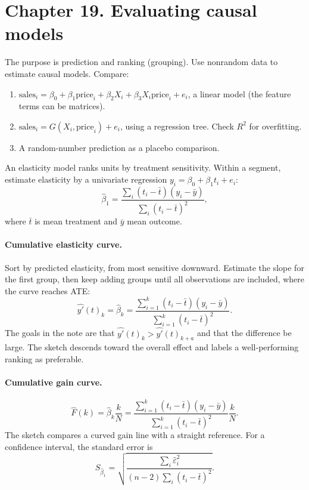 {\section{Chapter 19. Evaluating causal models}
The purpose is prediction and ranking (grouping). Use nonrandom data to estimate causal models. Compare:
\begin{enumerate}
\item $\mathrm{sales}_i=\beta_0+\beta_1\mathrm{price}_i+\beta_2X_i+\beta_3X_i\mathrm{price}_i+e_i$, a linear model (the feature terms can be matrices).
\item $\mathrm{sales}_i=G(X_i,\mathrm{price}_i)+e_i$, using a regression tree. Check $R^2$ for overfitting.
\item A random-number prediction as a placebo comparison.
\end{enumerate}
An elasticity model ranks units by treatment sensitivity. Within a segment, estimate elasticity by a univariate regression $y_i=\beta_0+\beta_1t_i+e_i$:
\[\hat\beta_1=\frac{\sum_i(t_i-\bar t)(y_i-\bar y)}{\sum_i(t_i-\bar t)^2},\]
where $\bar t$ is mean treatment and $\bar y$ mean outcome.

\paragraph{Cumulative elasticity curve.}
Sort by predicted elasticity, from most sensitive downward. Estimate the slope for the first group, then keep adding groups until all observations are included, where the curve reaches ATE:
\[\widehat{y'}(t)_k=\hat\beta_k=
\frac{\sum_{i=1}^{k}(t_i-\bar t)(y_i-\bar y)}{\sum_{i=1}^{k}(t_i-\bar t)^2}.\]
The goals in the note are that $\widehat{y'}(t)_k>\widehat{y'}(t)_{k+a}$ and that the difference be large. The sketch descends toward the overall effect and labels a well-performing ranking as preferable.

\paragraph{Cumulative gain curve.}
\[\widehat F(k)=\hat\beta_k\frac{k}{N}
=\frac{\sum_{i=1}^{k}(t_i-\bar t)(y_i-\bar y)}{\sum_{i=1}^{k}(t_i-\bar t)^2}\frac{k}{N}.\]
The sketch compares a curved gain line with a straight reference. For a confidence interval, the standard error is
\[S_{\hat\beta_1}=\sqrt{\frac{\sum_i\hat\varepsilon_i^2}{(n-2)\sum_i(t_i-\bar t)^2}}.\]

\begin{center}
\begin{tikzpicture}[>=Stealth, font=\small, line width=.65pt]


\end{tikzpicture}
\end{center}}
